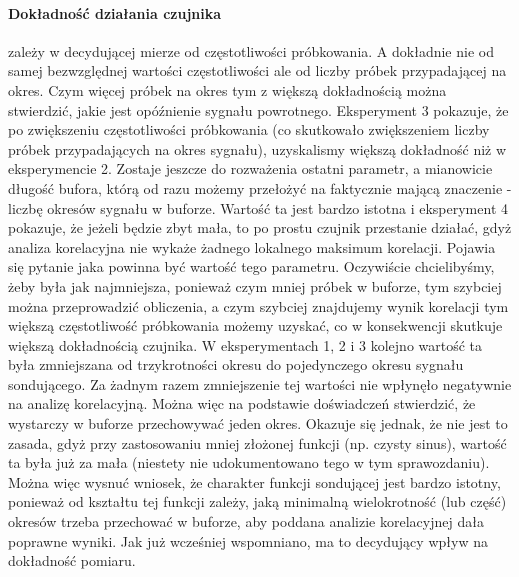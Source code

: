 \documentclass[12pt]{article}
\begin{document}
{{            \paragraph{Dokładność działania czujnika} zależy w decydującej mierze od
            częstotliwości próbkowania. A dokładnie nie od samej bezwzględnej wartości
            częstotliwości ale od liczby próbek przypadającej na okres. Czym więcej próbek
            na okres tym z większą dokładnością można stwierdzić, jakie jest opóźnienie
            sygnału powrotnego. Eksperyment 3 pokazuje, że po zwiększeniu częstotliwości
            próbkowania (co skutkowało zwiększeniem liczby próbek przypadających na okres
            sygnału), uzyskalismy większą dokładność niż w eksperymencie 2. Zostaje
            jeszcze do rozważenia ostatni parametr, a mianowicie długość bufora, którą od
            razu możemy przełożyć na faktycznie mającą znaczenie - liczbę okresów sygnału
            w buforze. Wartość ta jest bardzo istotna i eksperyment 4 pokazuje, że jeżeli
            będzie zbyt mała, to po prostu czujnik przestanie działać, gdyż analiza
            korelacyjna nie wykaże żadnego lokalnego maksimum korelacji. Pojawia się
            pytanie jaka powinna być wartość tego parametru. Oczywiście chcielibyśmy, żeby
            była jak najmniejsza, ponieważ czym mniej próbek w buforze, tym szybciej można
            przeprowadzić obliczenia, a czym szybciej znajdujemy wynik korelacji tym
            większą częstotliwość próbkowania możemy uzyskać, co w konsekwencji skutkuje
            większą dokładnością czujnika. W eksperymentach 1, 2 i 3 kolejno wartość ta
            była zmniejszana od trzykrotności okresu do pojedynczego okresu sygnału
            sondującego. Za żadnym razem zmniejszenie tej wartości nie wpłynęło negatywnie
            na analizę korelacyjną. Można więc na podstawie doświadczeń stwierdzić, że
            wystarczy w buforze przechowywać jeden okres. Okazuje się jednak, że nie jest
            to zasada, gdyż przy zastosowaniu mniej złożonej funkcji (np. czysty sinus),
            wartość ta była już za mała (niestety nie udokumentowano tego w tym
            sprawozdaniu). Można więc wysnuć wniosek, że charakter funkcji sondującej
            jest bardzo istotny, ponieważ od kształtu tej funkcji zależy, jaką minimalną
            wielokrotność (lub część) okresów trzeba przechować w buforze, aby poddana
            analizie korelacyjnej dała poprawne wyniki. Jak już wcześniej wspomniano, ma
            to decydujący wpływ na dokładność pomiaru.
        }
    }
\end{document}
